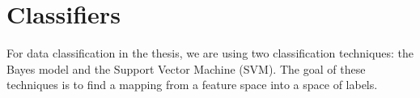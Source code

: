\chapter{Classifiers}\label{sec:classifiers}
For data classification in the thesis, we are using two classification techniques: the Bayes model and the Support Vector Machine (SVM). The goal of these techniques is to find a mapping from a feature space into a space of labels.






